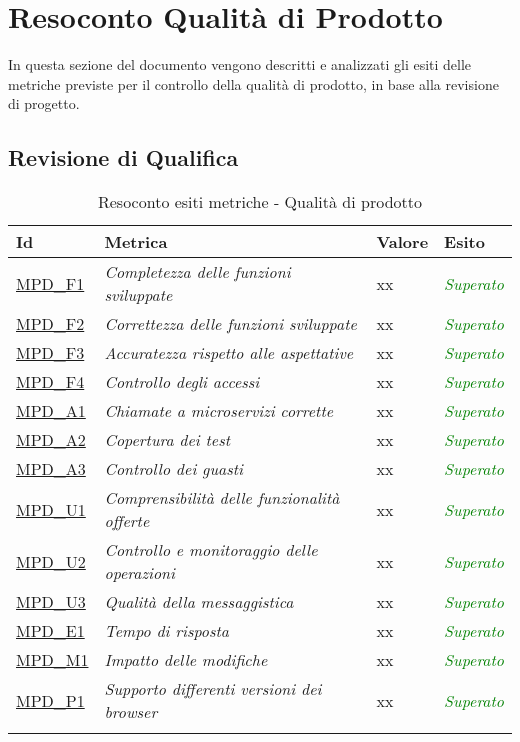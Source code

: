 \newpage
\section{Resoconto Qualità di Prodotto}

In questa sezione del documento vengono descritti e analizzati gli esiti delle metriche previste per il controllo della qualità di prodotto, in base alla revisione di progetto.

	\subsection{Revisione di Qualifica}
	
		\begin{longtable}{|>{\centering\arraybackslash}p{2cm}|>{\centering\arraybackslash}p{5cm}|>{\centering\arraybackslash}p{3cm}|>{\centering\arraybackslash}p{3cm}|}
			\hline
			\rowcolor{Gray}
			\textbf{Id} & \textbf{Metrica} & \textbf{Valore} & \textbf{Esito} \\
			\hline
				\hyperlink{MPDF1}{MPD\_F1} & \textit{Completezza delle funzioni sviluppate} & xx & \textcolor{Green}{\textit{Superato}}\\
				\hline
				\hyperlink{MPDF2}{MPD\_F2} & \textit{Correttezza delle funzioni sviluppate} & xx & \textcolor{Green}{\textit{Superato}}\\
				\hline
				\hyperlink{MPDF3}{MPD\_F3} & \textit{Accuratezza rispetto alle aspettative} & xx & \textcolor{Green}{\textit{Superato}}\\
				\hline
				\hyperlink{MPDF4}{MPD\_F4} & \textit{Controllo degli accessi} & xx & \textcolor{Green}{\textit{Superato}}\\
				\hline
				\hyperlink{MPDA1}{MPD\_A1} & \textit{Chiamate a microservizi corrette} & xx & \textcolor{Green}{\textit{Superato}}\\
				\hline
				\hyperlink{MPDA2}{MPD\_A2} & \textit{Copertura dei test} & xx & \textcolor{Green}{\textit{Superato}}\\
				\hline
				\hyperlink{MPDA3}{MPD\_A3} & \textit{Controllo dei guasti} & xx & \textcolor{Green}{\textit{Superato}}\\
				\hline
				\hyperlink{MPDU1}{MPD\_U1} & \textit{Comprensibilità delle funzionalità offerte} & xx & \textcolor{Green}{\textit{Superato}}\\
				\hline
				\hyperlink{MPDU2}{MPD\_U2} & \textit{Controllo e monitoraggio delle operazioni} & xx & \textcolor{Green}{\textit{Superato}}\\
				\hline
				\hyperlink{MPDU3}{MPD\_U3} & \textit{Qualità della messaggistica} & xx & \textcolor{Green}{\textit{Superato}}\\
				\hline
				\hyperlink{MPDE1}{MPD\_E1} & \textit{Tempo di risposta} & xx & \textcolor{Green}{\textit{Superato}}\\
				\hline
				\hyperlink{MPDM1}{MPD\_M1} & \textit{Impatto delle modifiche} & xx & \textcolor{Green}{\textit{Superato}}\\
				\hline
				\hyperlink{MPDP1}{MPD\_P1} & \textit{Supporto differenti versioni dei browser} & xx & \textcolor{Green}{\textit{Superato}}\\
				\hline
			
			\caption{Resoconto esiti metriche - Qualità di prodotto}
		\end{longtable}